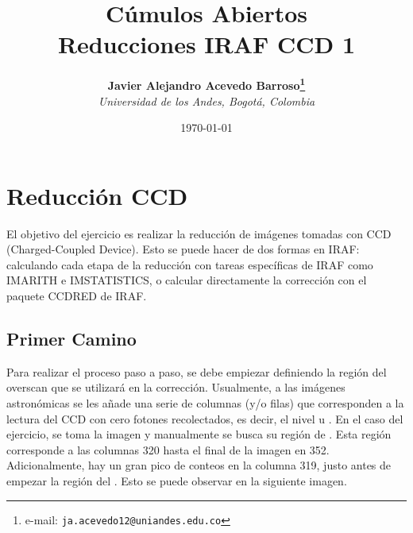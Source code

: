 \documentclass[12pt]{article}
\begin{document}
\title{Cúmulos Abiertos \\ Reducciones IRAF CCD 1}

\author{
\textbf{Javier Alejandro Acevedo Barroso\thanks{e-mail: \texttt{ja.acevedo12@uniandes.edu.co}}}\\
\textit{Universidad de los Andes, Bogotá, Colombia}\\
 }%

\date{\today}
\maketitle %


\normalsize
\newpage


\section{Reducción CCD}

El objetivo del ejercicio es realizar la reducción de imágenes tomadas con CCD (Charged-Coupled Device). Esto se puede hacer de dos formas en IRAF: calculando cada etapa de la reducción con tareas específicas de IRAF como IMARITH e IMSTATISTICS, o calcular directamente la corrección con el paquete CCDRED de IRAF.



\subsection{Primer Camino}
Para realizar el proceso paso a paso, se debe empiezar definiendo la región del overscan que se utilizará en la corrección. Usualmente, a las imágenes astronómicas se les añade una serie de columnas (y/o filas) que corresponden a la lectura del CCD con cero fotones recolectados, es decir, el nivel  u \cite{handbookCCD}. En el caso del ejercicio, se toma la imagen  y manualmente se busca su región de  . Esta región corresponde a las columnas 320 hasta el final de la imagen en 352. Adicionalmente, hay un gran pico de conteos en la columna 319, justo antes de empezar la región del  . Esto se puede observar en la siguiente imagen. \\
\end{document}
